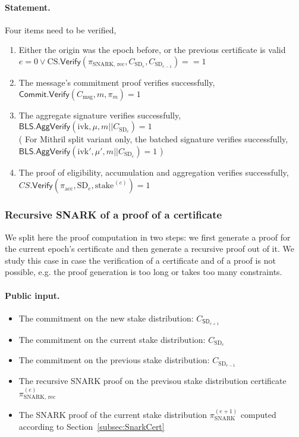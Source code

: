\documentclass{article}
\newcommand{\m}{\ensuremath{\textrm{msg}}\xspace}
\newcommand{\acc}{\ensuremath{\textrm{acc}}\xspace}
\newcommand{\stake}[1]{\ensuremath{\textrm{stake}_{#1}}\xspace}
\newcommand{\ivk}{\ensuremath{\textrm{ivk}}\xspace}
\newcommand{\BLS}{\ensuremath{\mathsf{BLS}}\xspace}
\newcommand{\Verify}{\ensuremath{\mathsf{Verify}}\xspace}
\newcommand{\AggVerify}{\ensuremath{\mathsf{AggVerify}}\xspace}
\newcommand{\Commit}{\ensuremath{\mathsf{Commit}}\xspace}
\begin{document}
\paragraph{Statement.}

Four items need to be verified,
\begin{enumerate}
    \item Either the origin was the epoch before, or the previous certificate is valid $e = 0 \lor \text{CS}.\Verify(\pi_\text{SNARK, rec}, C_{\text{SD}_e}, C_{\text{SD}_{e-1}}) == 1$
    \item The message's commitment proof verifies successfully,\\ $\Commit.\Verify(C_\m, m, \pi_m) = 1$
    \item The aggregate signature verifies successfully,\\ $\BLS.\AggVerify(\ivk, \mu, m || C_{\text{SD}_e}) = 1$\\
    ( For Mithril split variant only, the batched signature verifies successfully,\\ $\BLS.\AggVerify(\ivk', \mu', m || C_{\text{SD}_e}) = 1$ )
    \item The proof of eligibility, accumulation and aggregation verifies successfully,\\ $CS.\Verify(\pi_{\acc}, \text{SD}_e, \stake{}^{(e)}) = 1 $
\end{enumerate}

%
\subsubsection{Recursive SNARK of a proof of a certificate}\label{subsub:RecSnarkProof}
We split here the proof computation in two steps: we first generate a proof for the current epoch's certificate and then generate a recursive proof out of it. We study this case in case the verification of a certificate and of a proof is not possible, e.g. the proof generation is too long or takes too many constraints.


\paragraph{Public input.}
\begin{itemize}
    \item The commitment on the new stake distribution: $C_{\textsf{SD}_{e+1}}$
    \item The commitment on the current stake distribution: $C_{\text{SD}_e}$
    \item The commitment on the previous stake distribution: $C_{\text{SD}_{e-1}}$
    \item The recursive SNARK proof on the previsou stake distribution certificate $\pi_\text{SNARK, rec}^{(e)}$
    \item The SNARK proof of the current stake distribution $\pi_\text{SNARK}^{(e+1)}$ computed according to Section~\ref{subsec:SnarkCert}
\end{itemize}
\end{document}
